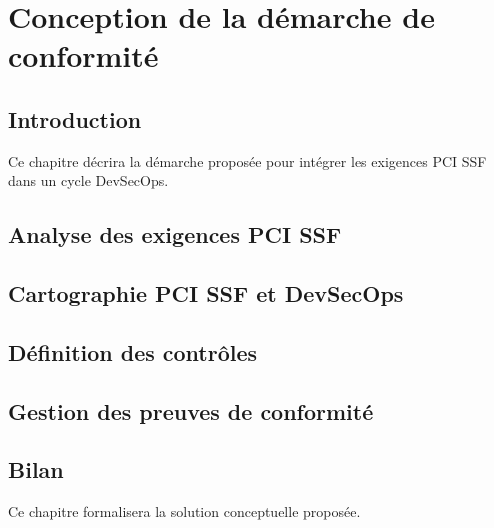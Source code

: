 \chapter{Conception de la démarche de conformité}
\clearpage

\section{Introduction}

Ce chapitre décrira la démarche proposée pour intégrer les exigences PCI SSF dans un cycle DevSecOps.

\section{Analyse des exigences PCI SSF}


\section{Cartographie PCI SSF et DevSecOps}


\section{Définition des contrôles}


\section{Gestion des preuves de conformité}


\section{Bilan}

Ce chapitre formalisera la solution conceptuelle proposée.

\clearpage

